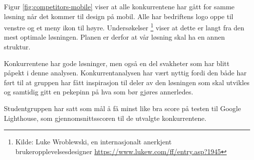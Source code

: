 Figur \ref{fig:competitors-mobile} viser at alle konkurrentene har gått for samme løsning når det kommer til design på mobil. Alle har bedriftens logo oppe til venstre og et meny ikon til høyre. Undersøkelser \footnote{Kilde: Luke Wroblewski, en internasjonalt anerkjent brukeropplevelsesdesigner \url{https://www.lukew.com/ff/entry.asp?1945}} viser at dette er langt fra den mest optimale løsningen. Planen er derfor at vår løsning skal ha en annen struktur.

Konkurrentene har gode løsninger, men også en del svakheter som har blitt påpekt i denne analysen. Konkurrentanalysen har vært nyttig fordi den både har ført til at gruppen har fått inspirasjon til deler av den løsningen som skal utvikles og samtidig gitt en pekepinn på hva som bør gjøres annerledes.

Studentgruppen har satt som mål å få minst like bra score på testen til Google Lighthouse, som gjennomsnittsscoren til de utvalgte konkurrentene.

